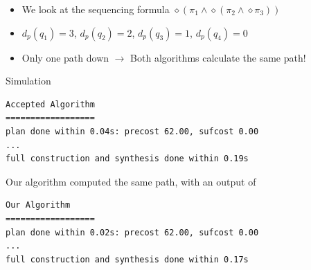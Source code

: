\documentclass{beamer}
\begin{document}
\begin{frame}
\begin{itemize}
	\item {
	We look at the sequencing formula $\diamond (\pi_1 \land \diamond(\pi_2 \land \diamond \pi_3))$
	}
\end{itemize}
\begin{figure}
\centering
{}
\end{figure}
\begin{itemize}
	\item {
	$d_p(q_1)=3$, $d_p(q_2)=2$, $d_p(q_3)=1$, $d_p(q_4)=0$
	}	
	\item {
	Only one path down $\rightarrow$ Both algorithms calculate the same path!
	}
\end{itemize}
\end{frame}

\begin{frame}[fragile]{Simulation}
\begingroup
\fontsize{9pt}{12pt}\selectfont
\begin{lstlisting}
Accepted Algorithm
==================
plan done within 0.04s: precost 62.00, sufcost 0.00
...
full construction and synthesis done within 0.19s 
\end{lstlisting}
\endgroup
Our algorithm computed the same path, with an output of

\begin{lstlisting}
Our Algorithm
==================
plan done within 0.02s: precost 62.00, sufcost 0.00
...
full construction and synthesis done within 0.17s 
\end{lstlisting}
\end{frame}
\end{document}
